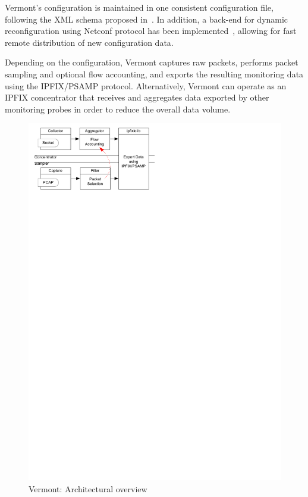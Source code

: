 Vermont's configuration is maintained in one consistent configuration file, following the XML schema proposed in~\cite{muenz-ipfix-configuration}. In addition, a back-end for dynamic reconfiguration using Netconf protocol has been implemented~\cite{muenz2006using}, allowing for fast remote distribution of new configuration data.

Depending on the configuration, Vermont captures raw packets, performs packet sampling and optional flow accounting, and exports the resulting monitoring data using the IPFIX/PSAMP protocol.
Alternatively, Vermont can operate as an IPFIX concentrator that receives and aggregates data exported by other monitoring probes in order to reduce the overall data volume.


\begin{figure}
\begin{center}
\includegraphics[scale=0.65]{gfx/vermont-arch2.pdf}
\caption{Vermont: Architectural overview}
\label{fig_allmodules}
\end{center}
\end{figure}


